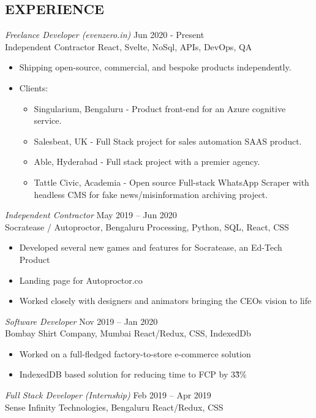 \documentclass[margin, 10pt]{res} %
\begin{document}
\begin{resume}
\section{EXPERIENCE}
{\sl Freelance Developer (evenzero.in)} \hfill Jun 2020 - Present \\
 Independent Contractor \hfill React, Svelte, NoSql, APIs, DevOps, QA
\begin{itemize}
\item Shipping open-source, commercial, and bespoke products independently.
\item Clients:
\begin{itemize}
\item Singularium, Bengaluru - Product front-end for an Azure cognitive service.
\item Salesbeat, UK - Full Stack project for sales automation SAAS product.
\item Able, Hyderabad - Full stack project with a premier agency.
\item Tattle Civic, Academia - Open source Full-stack WhatsApp Scraper with headless CMS for fake news/misinformation archiving project. 
\end{itemize}
\end{itemize}
{\sl Independent Contractor} \hfill May 2019 – Jun 2020 \\
Socratease / Autoproctor, Bengaluru \hfill Processing, Python, SQL, React, CSS
\begin{itemize}
\item Developed several new games and features for Socratease, an Ed-Tech Product
\item Landing page for Autoproctor.co
\item Worked closely with designers and animators bringing the CEOs vision to life 
\end{itemize}
{\sl Software Developer} \hfill Nov 2019 – Jan 2020 \\
Bombay Shirt Company, Mumbai \hfill React/Redux, CSS, IndexedDb
\begin{itemize}
\item Worked on a full-fledged factory-to-store e-commerce solution
\item IndexedDB based solution for reducing time to FCP by 3\~3\%
\end{itemize}
{\sl Full Stack Developer (Internship)} \hfill Feb 2019 – Apr 2019 \\
Sense Infinity Technologies, Bengaluru \hfill React/Redux, CSS


\end{resume}
\end{document}
